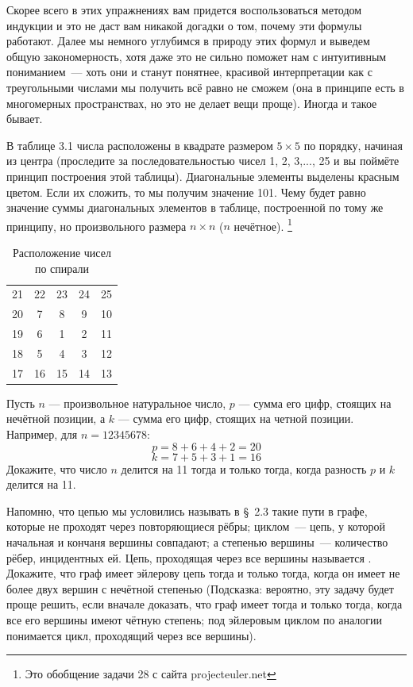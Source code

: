 Скорее всего в этих упражнениях вам придется воспользоваться методом индукции и это не даст вам никакой догадки о том, почему эти формулы работают. Далее мы немного углубимся в природу этих формул и выведем общую закономерность, хотя даже это не сильно поможет нам с интуитивным пониманием~--- хоть они и станут понятнее, красивой интерпретации как с треугольными числами мы получить всё равно не сможем (она в принципе есть в многомерных пространствах, но это не делает вещи проще). Иногда и такое бывает.

\begin{exercise}
В таблице 3.1 числа расположены в квадрате размером $5\times 5$ по порядку, начиная из центра (проследите за последовательностью чисел 1, 2, 3,..., 25 и вы поймёте принцип построения этой таблицы). Диагональные элементы выделены красным цветом. Если их сложить, то мы получим значение 101. Чему будет равно значение суммы диагональных элементов в таблице, построенной по тому же принципу, но произвольного размера $n\times n$ ($n$ нечётное).
\footnote{Это обобщение задачи 28 с сайта projecteuler.net}
\end{exercise}

\begin{table}[h]
\centering
\begin{tabular}{ccccc}
{\color{red} 21} &22& 23& 24& {\color{red} 25}\\
20 & {\color{red} 7} & 8 & {\color{red} 9}& 10\\
19 & 6&  {\color{red} 1}&  2& 11\\
18 & {\color{red} 5} & 4 & {\color{red} 3}& 12\\
{\color{red} 17}& 16& 15& 14& {\color{red} 13}
\end{tabular}
\caption{Расположение чисел по спирали}
\end{table}

\begin{exercise}
Пусть $n$ --- произвольное натуральное число, $p$ --- сумма его цифр, стоящих на нечётной позиции, а $k$ --- сумма его цифр, стоящих на четной позиции. Например, для $n=12345678$:
$$p=8+6+4+2 = 20$$
$$k=7+5+3+1 = 16$$
Докажите, что число $n$ делится на 11 тогда и только тогда, когда разность $p$ и $k$ делится на 11.
\end{exercise}

\begin{exercise}
Напомню, что цепью мы условились называть в \S~2.3 такие пути в графе, которые не проходят через повторяющиеся рёбры; циклом~--- цепь, у которой начальная и кончаня вершины совпадают; а степенью вершины~--- количество рёбер, инцидентных ей. Цепь, проходящая через все вершины называется . Докажите, что граф имеет эйлерову цепь тогда и только тогда, когда он имеет не более двух вершин с нечётной степенью (Подсказка: вероятно, эту задачу будет проще решить, если вначале доказать, что граф имеет  тогда и только тогда, когда все его вершины имеют чётную степень; под эйлеровым циклом по аналогии понимается цикл, проходящий через все вершины).
\end{exercise}


